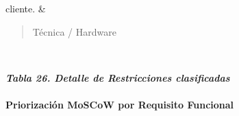 \documentclass[
]{article}
\begin{document}
{\begin{longtable}[]
cliente. & \begin{minipage}[t]{\linewidth}\raggedright
\begin{quote}
Técnica / Hardware
\end{quote}
\end{minipage} \\
\end{longtable}
}

\protect{}\label{_bookmark103}{}\emph{\textbf{Tabla 26.
Detalle de Restricciones clasificadas}}

\paragraph{Priorización MoSCoW por Requisito
Funcional}\label{priorizaciuxf3n-moscow-por-requisito-funcional}

\paragraph{}\label{section-12}
\end{document}
